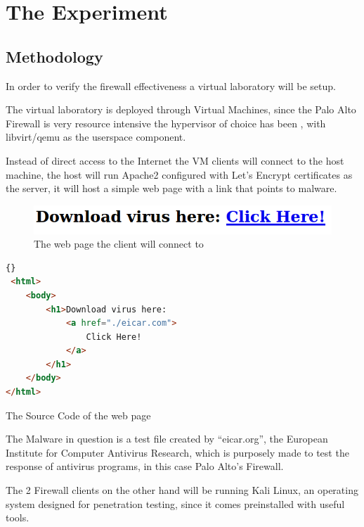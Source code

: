 \chapter{The Experiment}
\section{Methodology}

In order to verify the firewall effectiveness a virtual laboratory will be setup.

The virtual laboratory is deployed through Virtual Machines, since the Palo Alto Firewall is very resource intensive the hypervisor of choice has been \cite{kvm}, with libvirt/qemu\cite{libvirt}\cite{qemu} as the userspace component.

Instead of direct access to the Internet the VM clients will connect to the host machine, the host will run Apache2\cite{apache2} configured with Let's Encrypt\cite{letsencrypt} certificates as the  server, it will host a simple web page with a link that points to malware.

\begin{figure}[h!]
 \centering
 \includegraphics[width=13cm]{img/webpage.png}
 \caption{The web page the client will connect to}
 \label{fig: webpage}
\end{figure}

\begin{lstlisting}[language=html]{}
 <html>
    <body>
        <h1>Download virus here:
            <a href="./eicar.com">
                Click Here!
            </a>
        </h1>
    </body>
</html>
\end{lstlisting}

\begin{center}
The Source Code of the web page
\end{center}


The Malware in question is a test file created by ``eicar.org'', the European Institute for Computer Antivirus Research, which is purposely made to test the response of antivirus programs\cite{eicar}, in this case Palo Alto's Firewall.

The 2 Firewall clients on the other hand will be running  Kali Linux, an operating system designed for penetration testing, since it comes preinstalled with useful tools.

